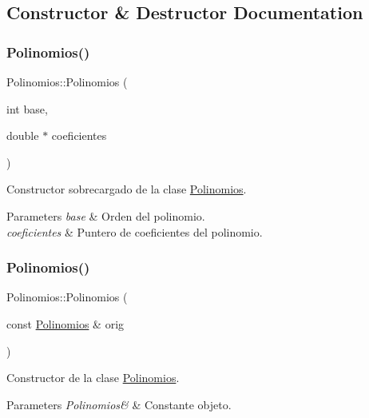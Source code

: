 \subsection{Constructor \& Destructor Documentation}
\hypertarget{class_polinomios_aeb9c018067d74b6294d4b272a5f397a2}{}\label{class_polinomios_aeb9c018067d74b6294d4b272a5f397a2} 
\subsubsection{\texorpdfstring{Polinomios()}{Polinomios()}\hspace{0.1cm}{\footnotesize\ttfamily [1/2]}}
{\ttfamily Polinomios\+::\+Polinomios (\begin{DoxyParamCaption}\item[{int}]{base,  }\item[{double $\ast$}]{coeficientes }\end{DoxyParamCaption})}



Constructor sobrecargado de la clase \hyperlink{class_polinomios}{Polinomios}. 


\begin{DoxyParams}{Parameters}
{\em base} & Orden del polinomio. \\
\hline
{\em coeficientes} & Puntero de coeficientes del polinomio. \\
\hline
\end{DoxyParams}
\hypertarget{class_polinomios_a399a99085decb3f03d9bca9c2cba06b6}{}\label{class_polinomios_a399a99085decb3f03d9bca9c2cba06b6} 
\subsubsection{\texorpdfstring{Polinomios()}{Polinomios()}\hspace{0.1cm}{\footnotesize\ttfamily [2/2]}}
{\ttfamily Polinomios\+::\+Polinomios (\begin{DoxyParamCaption}\item[{const \hyperlink{class_polinomios}{Polinomios} \&}]{orig }\end{DoxyParamCaption})}



Constructor de la clase \hyperlink{class_polinomios}{Polinomios}. 


\begin{DoxyParams}{Parameters}
{\em Polinomios\&} & Constante objeto. \\
\hline
\end{DoxyParams}


